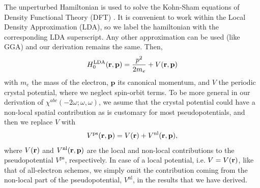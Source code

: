 \documentclass[floatfix,prb,aps,superscriptaddress,11pt,preprint,letterpaper]{revtex4}
\def\chon{black}
\begin{document}
The unperturbed Hamiltonian 
is used to solve the Kohn-Sham equations\cite{kohnPR65} of Density  
Functional Theory (DFT) {\color{\chon}. It is convenient to work within the Local 
Density Approximation (LDA), so we label the hamiltonian with the corresponding  
LDA superscript. Any other approximation can be used (like GGA) and our 
derivation remains the same.} Then,
\begin{equation}\label{h0}
H^{\mathrm{LDA}}_{0}(\mathbf{r},\mathbf{p})
=\frac{p^{2}}{2m_e}+V(\mathbf{r},\mathbf{p})
\end{equation}
with $m_e$ the mass of the electron, $\mathbf{p}$ its canonical momentum, and 
$V$
 the periodic crystal potential, where we neglect spin-orbit terms.
To be more general in our derivation of
$\chi^{abc}(-2\omega;\omega,\omega)$, we asume
that the crystal potential could have a {\color{\chon} non-local spatial}
contribution {\color{\chon} as} is customary for most
pseudopotentials, and then we replace $V$ with
\begin{align}\label{ps}
V^{\mathrm{ps}}(\mathbf{r},\mathbf{p})=V(\mathbf{r})+V^{\mathrm{nl}}(\mathbf{r},\mathbf{p})
,
\end{align}
where 
$V(\mathbf{r})$ and $V^{\mathrm{nl}}(\mathbf{r},\mathbf{p})$  are the local and 
non-local contributions to the pseudopotential $V^{\mathrm{ps}}$,
 respectively.
In case of
a local potential, i.e. $V= V(\mathbf{r})$, 
like that of all-electron schemes, 
we simply omit the contribution coming
from the non-local part of the pseudopotential, $V^{\mathrm{nl}}$, in
the results that we {\color{\chon} have derived.}  
\end{document}
